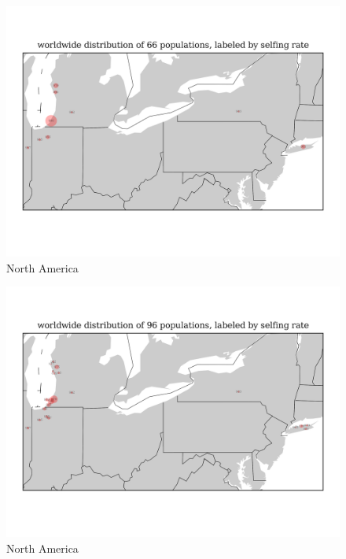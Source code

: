 \documentclass[a4paper,10pt]{article}
\begin{document}
\begin{figure}
\includegraphics[width=1\textwidth]{figures/s0829popid2ecotypeid_25_NorAm__88_38__72_45_l3y1_pop_map.png}
\caption{North America}\label{f18}
\end{figure}

\begin{figure}
\includegraphics[width=1\textwidth]{figures/s0829popid2ecotypeid_10_NorAm__88_38__72_45_l3y1_pop_map.png}
\caption{North America}\label{f17}
\end{figure}
\end{document}
